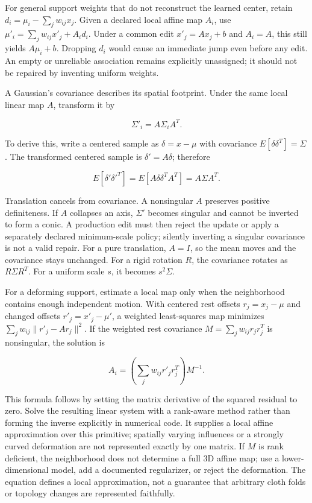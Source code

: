 For general support weights that do not reconstruct the learned center, retain \(d_i=\mu_i-\sum_jw_{ij}x_j\). Given a declared local affine map \(A_i\), use \(\mu'_i=\sum_jw_{ij}x'_j+A_id_i\). Under a common edit \(x'_j=Ax_j+b\) and \(A_i=A\), this still yields \(A\mu_i+b\). Dropping \(d_i\) would cause an immediate jump even before any edit. An empty or unreliable association remains explicitly unassigned; it should not be repaired by inventing uniform weights.

A Gaussian's covariance describes its spatial footprint. Under the same local linear map \(A\), transform it by

\[
\Sigma'_i=A\Sigma_iA^T.
\]

To derive this, write a centered sample as \(\delta=x-\mu\) with covariance \(E[\delta\delta^T]=\Sigma\). The transformed centered sample is \(\delta'=A\delta\); therefore

\[
E[\delta'\delta'^T]=E[A\delta\delta^TA^T]=A\Sigma A^T.
\]

Translation cancels from covariance. A nonsingular \(A\) preserves positive definiteness. If \(A\) collapses an axis, \(\Sigma'\) becomes singular and cannot be inverted to form a conic. A production edit must then reject the update or apply a separately declared minimum-scale policy; silently inverting a singular covariance is not a valid repair. For a pure translation, \(A=I\), so the mean moves and the covariance stays unchanged. For a rigid rotation \(R\), the covariance rotates as \(R\Sigma R^T\). For a uniform scale \(s\), it becomes \(s^2\Sigma\).

For a deforming support, estimate a local map only when the neighborhood contains enough independent motion. With centered rest offsets \(r_j=x_j-\mu\) and changed offsets \(r'_j=x'_j-\mu'\), a weighted least-squares map minimizes \(\sum_jw_{ij}\|r'_j-Ar_j\|^2\). If the weighted rest covariance \(M=\sum_jw_{ij}r_jr_j^T\) is nonsingular, the solution is

\[
A_i=\left(\sum_jw_{ij}r'_jr_j^T\right)M^{-1}.
\]

This formula follows by setting the matrix derivative of the squared residual to zero. Solve the resulting linear system with a rank-aware method rather than forming the inverse explicitly in numerical code. It supplies a local affine approximation over this primitive; spatially varying influences or a strongly curved deformation are not represented exactly by one matrix. If \(M\) is rank deficient, the neighborhood does not determine a full 3D affine map; use a lower-dimensional model, add a documented regularizer, or reject the deformation. The equation defines a local approximation, not a guarantee that arbitrary cloth folds or topology changes are represented faithfully.

